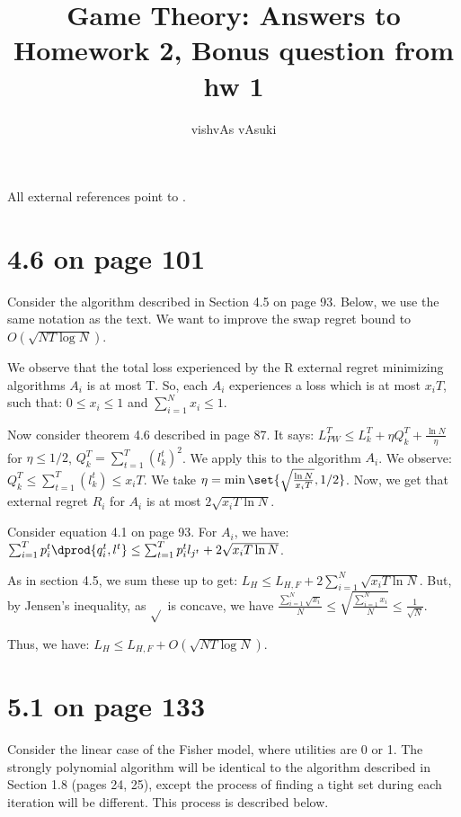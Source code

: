 \documentclass[10pt]{amsart}
\title{Game Theory: Answers to Homework 2, Bonus question from hw 1}
\author{vishvAs vAsuki}
\begin{document}
\maketitle
\begin{rem}
All external references point to \cite{algGameTheory}.
\end{rem}

\section{4.6 on page 101}
Consider the algorithm described in Section 4.5 on page 93. Below, we use the same notation as the text. We want to improve the swap regret bound to $O(\sqrt{NT\log N})$.

We observe that the total loss experienced by the R external regret minimizing algorithms $A_{i}$ is at most T. So, each $A_{i}$ experiences a loss which is at most $x_{i}T$, such that: $0 \leq x_{i} \leq 1$ and $\sum_{i=1}^{N}x_{i} \leq 1$.

Now consider theorem 4.6 described in page 87. It says: $L_{PW}^{T} \leq L_{k}^{T} + \eta Q_{k}^{T} + \frac{\ln N}{\eta}$ for $\eta \leq 1/2$, $Q_{k}^{T} = \sum_{t=1}^{T}(l_{k}^{t})^{2}$. We apply this to the algorithm $A_{i}$. We observe: $Q_{k}^{T} \leq \sum_{t=1}^{T}(l_{k}^{t}) \leq x_{i}T$. We take $\eta = \min \set{\sqrt{\frac{\ln N}{x_{i}T}}, 1/2}$. Now, we get that external regret $R_{i}$ for $A_{i}$ is at most $2\sqrt{x_{i}T \ln N}$.

Consider equation 4.1 on page 93. For $A_{i}$, we have: $\sum_{i=1}^{T}p_{i}^{t}\dprod{q_{i}^{t}, l^{t}} \leq \sum_{t=1}^{T}p_{i}^{t}l_{j^{t}} + 2\sqrt{x_{i}T \ln N}$.

As in section 4.5, we sum these up to get: $L_{H} \leq L_{H, F} + 2\sum_{i=1}^{N}\sqrt{x_{i}T \ln N}$. But, by Jensen's inequality, as $\sqrt{}$ is concave, we have $\frac{\sum_{i=1}^{N}\sqrt{x_{i}}}{N} \leq \sqrt{\frac{\sum_{i=1}^{N}x_{i}}{N}} \leq \frac{1}{\sqrt{N}}$.

Thus, we have: $L_{H} \leq L_{H, F} + O(\sqrt{NT\log N})$.

\section{5.1 on page 133}
Consider the linear case of the Fisher model, where utilities are 0 or 1. The strongly polynomial algorithm will be identical to the algorithm described in  Section 1.8 (pages 24, 25), except the process of finding a tight set during each iteration will be different. This process is described below.
\end{document}
